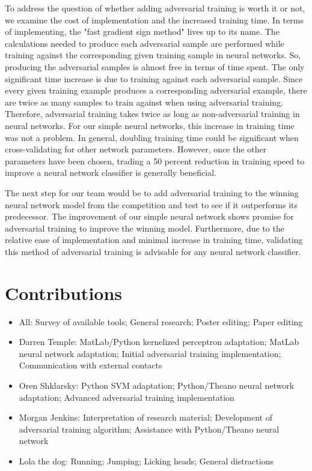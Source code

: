 \documentclass{article} %
\begin{document}
To address the question of whether adding adversarial training is worth it or not, we examine the cost of implementation and the increased training time. In terms of implementing, the "fast gradient sign method" lives up to its name. The calculations needed to produce each adversarial sample are performed while training against the corresponding given training sample in neural networks. So, producing the adversarial samples is almost free in terms of time spent. The only significant time increase is due to training against each adversarial sample. Since every given training example produces a corresponding adversarial example, there are twice as many samples to train against when using adversarial training. Therefore, adversarial training takes twice as long as non-adversarial training in neural networks. For our simple neural networks, this increase in training time was not a problem. In general, doubling training time could be significant when cross-validating for other network parameters. However, once the other parameters have been chosen, trading a 50 percent reduction in training speed to improve a neural network classifier is generally beneficial.

The next step for our team would be to add adversarial training to the winning neural network model from the competition and test to see if it outperforms its predecessor. The improvement of our simple neural network shows promise for adversarial training to improve the winning model. Furthermore, due to the relative ease of implementation and minimal increase in training time, validating this method of adversarial training is advisable for any neural network classifier.


\section*{Contributions}
\label{sec:contributions}

\begin{itemize}
\item All: Survey of available tools; General research; Poster editing; Paper editing
\item Darren Temple: MatLab/Python kernelized perceptron adaptation; MatLab neural network adaptation; Initial adversarial training implementation; Communication with external contacts
\item Oren Shklarsky: Python SVM adaptation; Python/Theano neural network adaptation; Advanced adversarial training implementation
\item Morgan Jenkins: Interpretation of research material; Development of adversarial training algorithm; Assistance with Python/Theano neural network
\item Lola the dog: Running; Jumping; Licking heads; General distractions
\end{itemize}
\end{document}
